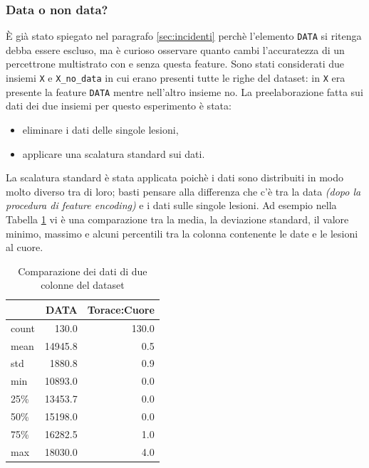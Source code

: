 \documentclass[12pt, twoside, letterpaper]{report}
\begin{document}
			\subsubsection{Data o non data?}			
				È già stato spiegato nel paragrafo \ref{sec:incidenti} perchè l'elemento \texttt{DATA} si ritenga debba essere escluso, ma è curioso osservare quanto cambi l'accuratezza di un percettrone multistrato con e senza questa feature. Sono stati considerati due insiemi \texttt{X} e \texttt{X\_no\_data} in cui erano presenti tutte le righe del dataset: in \texttt{X} era presente la feature \texttt{DATA} mentre nell'altro insieme no. La preelaborazione fatta sui dati dei due insiemi per questo esperimento è stata: 
				\begin{itemize}
					\item eliminare i dati delle singole lesioni,
					\item applicare una scalatura standard sui dati.
				\end{itemize}
				La scalatura standard è stata applicata poichè i dati sono distribuiti in modo molto diverso tra di loro; basti pensare alla differenza che c'è tra la data \textit{(dopo la procedura di feature encoding)} e i dati sulle singole lesioni. Ad esempio nella Tabella \ref{tab:differenza_data} vi è una comparazione tra la media, la deviazione standard, il valore minimo, massimo e alcuni percentili tra la colonna contenente le date e le lesioni al cuore.
				
				\begin{table}
				\centering
				\begin{tabular}{lrr}
				\toprule
				{} &          DATA &  Torace:Cuore \\
				\midrule
				count &    130.0 &    130.0 \\
				mean  &  14945.8 &      0.5 \\
				std   &   1880.8 &      0.9 \\
				min   &  10893.0 &      0.0 \\
				25\%   &  13453.7 &      0.0 \\
				50\%   &  15198.0 &      0.0 \\
				75\%   &  16282.5 &      1.0 \\
				max   &  18030.0 &      4.0 \\
				\bottomrule
				\end{tabular}
				\caption{Comparazione dei dati di due colonne del dataset}
				\label{tab:differenza_data}
				\end{table}
				
\end{document}
